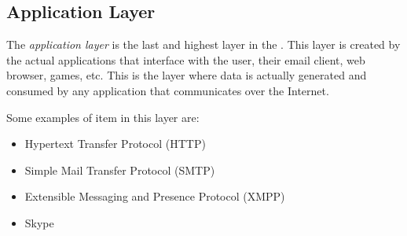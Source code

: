 \subsection{Application Layer}\label{subsec:Application_Layer}
\begin{definition}\label{def:Application_Layer}
  The \emph{application layer} is the last and highest layer in the .
  This layer is created by the actual applications that interface with the user, their email client, web browser, games, etc.
  This is the layer where data is actually generated and consumed by any application that communicates over the Internet.

  Some examples of item in this layer are:
  \begin{itemize}[noitemsep]
  \item Hypertext Transfer Protocol (HTTP)
  \item Simple Mail Transfer Protocol (SMTP)
  \item Extensible Messaging and Presence Protocol (XMPP)
  \item Skype
  \end{itemize}
\end{definition}


